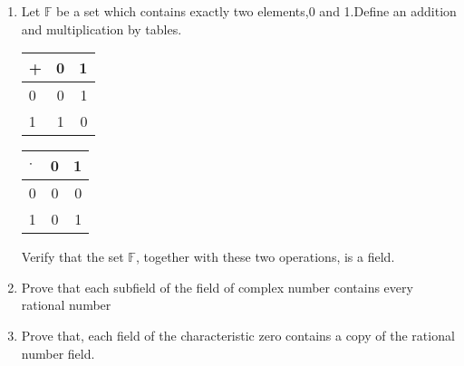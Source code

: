 \renewcommand{\theequation}{\theenumi}
\renewcommand{\thefigure}{\theenumi}
\begin{enumerate}[label=\thesection.\arabic*.,ref=\thesection.\theenumi]
%
\item Let $\mathbb{F}$ be a set which contains exactly two elements,0 and 1.Define an addition and multiplication by tables.
\begin{table}[h!]
  \begin{center}
    \label{eq:solutions/1/1/5/tab:table1}
    \begin{tabular}{l|c|r}
      + & 0 & 1 \\
      \hline
      0 & 0 & 1\\
      1 & 1 & 0
    \end{tabular}
  \end{center}
\end{table}
\begin{table}[h!]
  \begin{center}
    \label{eq:solutions/1/1/5/tab:table2}
    \begin{tabular}{l|c|r}
      $\cdot$ & 0 & 1 \\
      \hline
      0 & 0 & 0\\
      1 & 0 & 1
    \end{tabular}
  \end{center}
\end{table}
  Verify that the set $\mathbb{F}$, together with these two operations, is a field.
%
\\
\solution

\item Prove that each subfield of the field of complex number contains every rational number
\\
\solution

%
\item Prove that, each field of the characteristic zero contains a copy of the rational number field.
\\
\solution

\end{enumerate}


